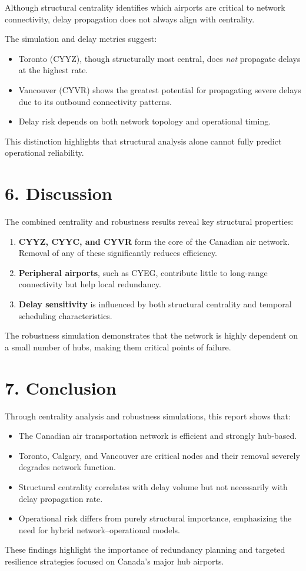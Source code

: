 \documentclass[10pt]{article}
\begin{document}
Although structural centrality identifies which airports are critical to network connectivity, delay propagation does not always align with centrality.

The simulation and delay metrics suggest:

\begin{itemize}
    \item Toronto (CYYZ), though structurally most central, does \emph{not} propagate delays at the highest rate.
    \item Vancouver (CYVR) shows the greatest potential for propagating severe delays due to its outbound connectivity patterns.
    \item Delay risk depends on both network topology and operational timing.
\end{itemize}

This distinction highlights that structural analysis alone cannot fully predict operational reliability.

\section*{6. Discussion}

The combined centrality and robustness results reveal key structural properties:

\begin{enumerate}
    \item \textbf{CYYZ, CYYC, and CYVR} form the core of the Canadian air network. Removal of any of these significantly reduces efficiency.
    \item \textbf{Peripheral airports}, such as CYEG, contribute little to long-range connectivity but help local redundancy.
    \item \textbf{Delay sensitivity} is influenced by both structural centrality and temporal scheduling characteristics.
\end{enumerate}

The robustness simulation demonstrates that the network is highly dependent on a small number of hubs, making them critical points of failure.

\section*{7. Conclusion}

Through centrality analysis and robustness simulations, this report shows that:

\begin{itemize}
    \item The Canadian air transportation network is efficient and strongly hub-based.
    \item Toronto, Calgary, and Vancouver are critical nodes and their removal severely degrades network function.
    \item Structural centrality correlates with delay volume but not necessarily with delay propagation rate.
    \item Operational risk differs from purely structural importance, emphasizing the need for hybrid network–operational models.
\end{itemize}

These findings highlight the importance of redundancy planning and targeted resilience strategies focused on Canada’s major hub airports.
\end{document}
